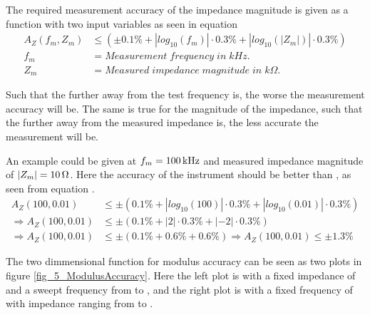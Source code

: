 The required measurement accuracy of the impedance magnitude is given as a function with two input variables as seen in equation
\begin{equation}
  \begin{split}
      \label{eq:5:A_Z}
      A_Z(f_m, Z_m) & \leq \left(\pm 0.1\% + |log_{10}\left( f_m \right)|\cdot0.3\%+ |log_{10}\left( |Z_m| \right)|\cdot0.3\%\right)\\
      f_m & = Measurement \; frequency \; in \; kHz. \\
      Z_m &= Measured \; impedance \; magnitude \; in \; k\Omega.
  \end{split}
\end{equation}

Such that the further away from  the test frequency is, the worse the measurement accuracy will be. The same 
is true for the magnitude of the impedance, such that the further away from  the measured impedance is, the less
accurate the measurement will be.

An example could be given at $f_ m = \SI{100}{\kilo\hertz}$ and measured impedance magnitude of $|Z_m| = \SI{10}{\ohm}$. Here the
accuracy of the instrument should be better than , as seen from equation .
\begin{equation}
  \label{eq:5:A_Z_example}
  \begin{split}
    A_Z(100, 0.01) & \leq \pm \left(0.1\% + |log_{10}(100)|\cdot0.3\%+|log_{10}(0.01)|\cdot0.3\% \right)\\
    \Rightarrow A_Z(100, 0.01) & \leq \pm \left( 0.1\% + |2|\cdot0.3\%+|-2|\cdot0.3\% \right) \\
    \Rightarrow A_Z(100,0.01) & \leq \pm \left( 0.1\% + 0.6\% + 0.6\% \right) \Rightarrow A_Z(100,0.01) \leq \pm 1.3\% 
  \end{split}
\end{equation}

The two dimmensional function for modulus accuracy can be seen as two plots in figure \ref{fig_5_ModulusAccuracy}. Here the left plot is with a fixed impedance of 
and a sweept frequency from  to , and the right plot is with a fixed frequency of  with impedance ranging from  to .


